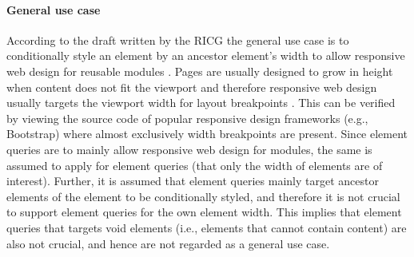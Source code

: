 \documentclass[a4paper,11pt]{kth-mag}
\begin{document}
      \paragraph{General use case}
      According to the draft written by the \gls{RICG} the general use case is to conditionally style an element by an ancestor \gls{element}'s width to allow \gls{responsive} \gls{web} design for reusable modules \cite{ricg_draft}.
      Pages are usually designed to grow in height when content does not fit the \gls{viewport} and therefore \gls{responsive} \gls{web} design usually targets the \gls{viewport} width for layout breakpoints \cite{book_rwd,wiki_rwd,mjelde2014performance}.
      This can be verified by viewing the source code of popular \gls{responsive} design frameworks (e.g., \gls{Bootstrap}) where almost exclusively width breakpoints are present.
      Since element queries are to mainly allow \gls{responsive} \gls{web} design for modules, the same is assumed to apply for element queries (that only the width of \glspl{element} are of interest).
      Further, it is assumed that element queries mainly target ancestor \glspl{element} of the element to be conditionally styled, and therefore it is not crucial to support element queries for the own element width.
      This implies that element queries that targets void \glspl{element} (i.e., \glspl{element} that cannot contain content) are also not crucial, and hence are not regarded as a general use case.


\end{document}
